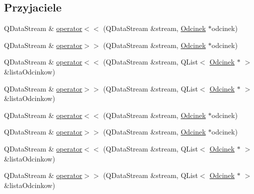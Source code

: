 \subsection*{Przyjaciele}
\begin{DoxyCompactItemize}
\item 
Q\-Data\-Stream \& \hyperlink{classOdcinek_a54913b7ab9654872bb66619feaf821f4}{operator$<$$<$} (Q\-Data\-Stream \&stream, \hyperlink{classOdcinek}{Odcinek} $\ast$odcinek)
\item 
Q\-Data\-Stream \& \hyperlink{classOdcinek_ae20cd701784a85cc5ea7268940691ac6}{operator$>$$>$} (Q\-Data\-Stream \&stream, \hyperlink{classOdcinek}{Odcinek} $\ast$odcinek)
\item 
Q\-Data\-Stream \& \hyperlink{classOdcinek_a9aca005bee3cad8516d99bdcb40acd86}{operator$<$$<$} (Q\-Data\-Stream \&stream, Q\-List$<$ \hyperlink{classOdcinek}{Odcinek} $\ast$ $>$ \&lista\-Odcinkow)
\item 
Q\-Data\-Stream \& \hyperlink{classOdcinek_ade23b0a1d36176236c6a823aff5e6288}{operator$>$$>$} (Q\-Data\-Stream \&stream, Q\-List$<$ \hyperlink{classOdcinek}{Odcinek} $\ast$ $>$ \&lista\-Odcinkow)
\item 
Q\-Data\-Stream \& \hyperlink{classOdcinek_a54913b7ab9654872bb66619feaf821f4}{operator$<$$<$} (Q\-Data\-Stream \&stream, \hyperlink{classOdcinek}{Odcinek} $\ast$odcinek)
\item 
Q\-Data\-Stream \& \hyperlink{classOdcinek_ae20cd701784a85cc5ea7268940691ac6}{operator$>$$>$} (Q\-Data\-Stream \&stream, \hyperlink{classOdcinek}{Odcinek} $\ast$odcinek)
\item 
Q\-Data\-Stream \& \hyperlink{classOdcinek_a9aca005bee3cad8516d99bdcb40acd86}{operator$<$$<$} (Q\-Data\-Stream \&stream, Q\-List$<$ \hyperlink{classOdcinek}{Odcinek} $\ast$ $>$ \&lista\-Odcinkow)
\item 
Q\-Data\-Stream \& \hyperlink{classOdcinek_ade23b0a1d36176236c6a823aff5e6288}{operator$>$$>$} (Q\-Data\-Stream \&stream, Q\-List$<$ \hyperlink{classOdcinek}{Odcinek} $\ast$ $>$ \&lista\-Odcinkow)
\end{DoxyCompactItemize}


